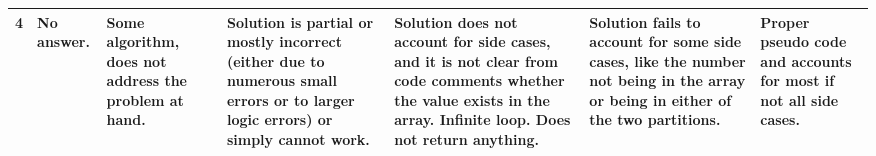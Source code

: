 \begin{tabularx}{\linewidth}{XXXXXXX}
4  & No answer. & Some algorithm, does not address the problem at hand.                                                                           & Solution is partial or mostly incorrect (either due to numerous small errors or to larger logic errors) or simply cannot work.                                                  & Solution does not account for side cases, and it is not clear from code comments whether the value exists in the array. Infinite loop. Does not return anything.                                                                                                                                                                                                                                                                                                                                                   & Solution fails to account for some side cases, like the number not being in the array or being in either of the two partitions.         & Proper pseudo code and accounts for most if not all side cases.                            \\ \hline                       
\end{tabularx}

\newpage